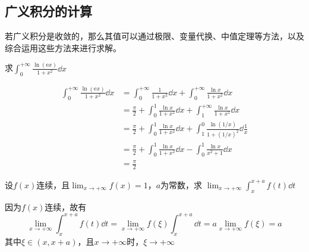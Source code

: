 \subsection{广义积分的计算}
若广义积分是收敛的，那么其值可以通过极限、变量代换、中值定理等方法，以及综合运用这些方法来进行求解。
\begin{example}
    求$\displaystyle\int_0^{+\infty}\frac{\ln(\mathrm{e}x)}{1+x^2}\dd{x}$
\end{example}
\begin{solution}
    \begin{align*}
        \int_0^{+\infty}\frac{\ln(\mathrm{e}x)}{1+x^2}\dd{x}
         & = \int_0^{+\infty} \frac{1}{1+x^2}\dd{x} + \int_0^{+\infty}\frac{\ln x}{1+x^2}\dd{x}                        \\
         & = \frac{\pi}{2} + \int_0^1 \frac{\ln x}{1+x^2}\dd{x} + \int_1^{+\infty} \frac{\ln x}{1+x^2}\dd{x}           \\
         & = \frac{\pi}{2} + \int_0^1 \frac{\ln x}{1+x^2}\dd{x} + \int_1^0 \frac{\ln (1/x)}{1+(1/x)^2}\dd{\frac{1}{x}} \\
         & = \frac{\pi}{2} + \int_0^1 \frac{\ln x}{1+x^2}\dd{x} - \int_0^1 \frac{\ln x}{x^2+1}\dd{x}                   \\
         & = \frac{\pi}{2}
    \end{align*}
\end{solution}

\begin{example}
    设$f(x)$连续，且$\displaystyle\lim_{x\to+\infty} f(x) = 1$，$a$为常数，求
    $\displaystyle\lim_{x\to+\infty}\int_x^{x+a}f(t)\dd{t}$
\end{example}
\begin{solution}
    因为$f(x)$连续，故有
    \[
        \lim_{x\to+\infty}\int_x^{x+a}f(t)\dd{t}
        =
        \lim_{x\to+\infty}f(\xi)\int_x^{x+a}\dd{t}
        =
        a\lim_{x\to+\infty} f(\xi)
        =
        a
    \]
    其中$\xi\in(x,x+a)$，且$x\to+\infty$时，$\xi\to+\infty$
\end{solution}

